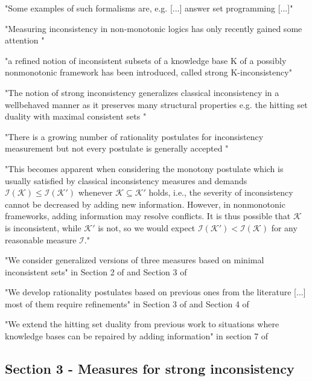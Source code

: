 "Some examples of such formalisms are, e.g. [...] answer set programming \cite{gelfond_logic_2002} [...]"

"Measuring inconsistency in non-monotonic logics has only recently gained some attention \cite{ulbricht_measuring_2018} \cite{brewka_strong_2019} \cite{michael_measuring_2016} \cite{brewka_strong_2017}"

"a refined notion of inconsistent subsets of a knowledge base K of a possibly nonmonotonic framework has been introduced, called strong K-inconsistency"
\cite{brewka_strong_2017}

"The notion of strong inconsistency generalizes classical inconsistency in a wellbehaved manner as it preserves many structural properties e.g. the hitting set duality with maximal consistent sets \cite{reiter_theory_1987}"

"There is a growing number of rationality postulates for inconsistency measurement but not every postulate is generally accepted \cite{hameurlain_basic_2017} \cite{ferme_revisiting_2014}"

"This becomes apparent when considering the monotony postulate which is usually satisfied by classical inconsistency measures and demands \(\mathcal{I}(\mathcal{K}) \leq \mathcal{I}(\mathcal{K}')\) whenever \(\mathcal{K} \subseteq \mathcal{K}'\) holds, i.e., the severity of inconsistency cannot be decreased by adding new information. However, in nonmonotonic frameworks, adding information may resolve conflicts. It is thus possible that \(\mathcal{K}\) is inconsistent, while \(\mathcal{K}'\) is not, so we would expect \(\mathcal{I}(\mathcal{K}') < \mathcal{I}(\mathcal{K})\) for any reasonable measure \(\mathcal{I}\)."

"We consider generalized versions of three measures based on minimal inconsistent sets" in Section 2 of \cite{ulbricht_measuring_2018} and Section 3 of \cite{ulbricht_handling_2020}

"We develop rationality postulates based on previous ones from the literature [...] most of them require refinements" in Section 3 of \cite{ulbricht_measuring_2018} and Section 4 of \cite{ulbricht_handling_2020}

"We extend the hitting set duality from previous work \cite{brewka_strong_2019} to situations where knowledge bases can be repaired by adding information" in section 7 of \cite{ulbricht_handling_2020}

\subsection{Section 3 - Measures for strong inconsistency}
\cite{ulbricht_handling_2020}

